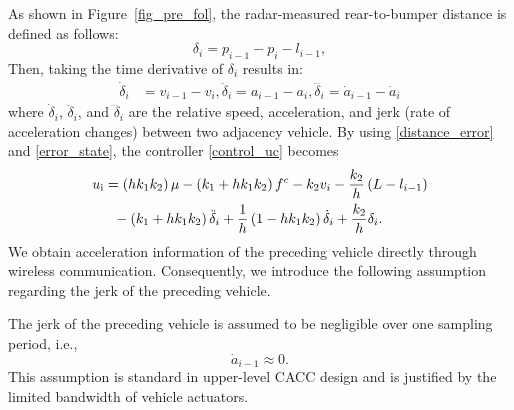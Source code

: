 {%

As shown in Figure~\ref{fig_pre_fol}, the radar-measured rear-to-bumper distance is defined as follows:
\begin{equation} \label{distance_error}
    \delta_{i}=p_{i-1}-p_{i}-l_{i-1},
\end{equation}
Then, taking the time derivative of $\delta_i$ results in:
    \begin{align}\label{error_state}
         \dot{\delta}_i&={v}_{i-1}-{v}_i, \ddot{\delta}_i={a}_{i-1}-{a}_i, \dddot{\delta_{i}}=\dot{a}_{i-1}-\dot{a}_i%
    \end{align}
where $\dot{\delta}_{i}$, $\ddot{\delta}_{i}$, and $\dddot{\delta}_{i}$ are the relative speed, acceleration, and jerk (rate of acceleration changes) between two adjacency vehicle. By using \eqref{distance_error} and \eqref{error_state}, the controller \eqref{control_uc} becomes 
\begin{align}\label{control_new}
        u_{\text{i}}&=\left(h k_1 k_2\right)\mu-\left(k_1+h k_1 k_2\right) f^c - k_2 v_i -\frac{k_2}{h}\left(L-l_{i-1}\right)  \notag\\
       &~~ -\left(k_1+h k_1 k_2\right) \ddot{\delta}_i+\frac{1}{h}\left(1-h k_1 k_2\right) \dot{\delta}_i+\frac{k_2}{h} \delta_i.%
\end{align}
We obtain acceleration information of the preceding vehicle directly through wireless communication. Consequently, we introduce the following assumption regarding the jerk of the preceding vehicle.

\begin{assumption}\label{ass:jerk}
The jerk of the preceding vehicle is assumed to be negligible over one sampling period, i.e.,
\begin{equation}\label{jerk0}
    \dot{a}_{i-1} \approx 0.
\end{equation}
This assumption is standard in upper-level CACC design and is justified by the limited bandwidth of vehicle actuators.
\end{assumption}

}
